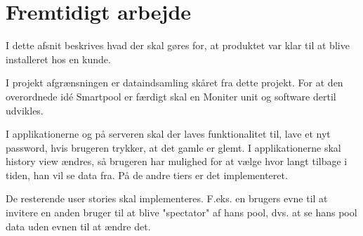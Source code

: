 \chapter{Fremtidigt arbejde}
I dette afsnit beskrives hvad der skal gøres for, at produktet var klar til at blive installeret hos en kunde.

I projekt afgrænsningen er dataindsamling skåret fra dette projekt. For at den overordnede idé Smartpool er færdigt skal en Moniter unit og software dertil udvikles.

I applikationerne og på serveren skal der laves funktionalitet til, lave et nyt password, hvis brugeren trykker, at det gamle er glemt.
I applikationerne skal history view ændres, så brugeren har mulighed for at vælge hvor langt tilbage i tiden, han vil se data fra. På de andre tiers er det implementeret.

De resterende user stories skal implementeres. F.eks. en brugers evne til at invitere en anden bruger til at blive "spectator" af hans pool, dvs. at se hans pool data uden evnen til at ændre det.

